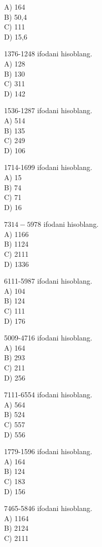 A) 164\\
B) 50,4\\
C) 111\\
D) 15,6
  \item 1376-1248 ifodani hisoblang.\\
A) 128\\
B) 130\\
C) 311\\
D) 142
  \item 1536-1287 ifodani hisoblang.\\
A) 514\\
B) 135\\
C) 249\\
D) 106
  \item 1714-1699 ifodani hisoblang.\\
A) 15\\
B) 74\\
C) 71\\
D) 16
  \item $7314-5978$ ifodani hisoblang.\\
A) 1166\\
B) 1124\\
C) 2111\\
D) 1336
  \item 6111-5987 ifodani hisoblang.\\
A) 104\\
B) 124\\
C) 111\\
D) 176
  \item 5009-4716 ifodani hisoblang.\\
A) 164\\
B) 293\\
C) 211\\
D) 256
  \item 7111-6554 ifodani hisoblang.\\
A) 564\\
B) 524\\
C) 557\\
D) 556
  \item 1779-1596 ifodani hisoblang.\\
A) 164\\
B) 124\\
C) 183\\
D) 156
  \item 7465-5846 ifodani hisoblang.\\
A) 1164\\
B) 2124\\
C) 2111\\
